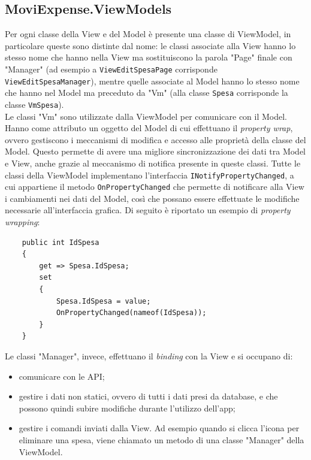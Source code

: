 \subsection{MoviExpense.ViewModels}

Per ogni classe della View e del Model è presente una classe di ViewModel, in particolare queste sono distinte dal nome: le classi associate alla View hanno lo stesso nome che hanno nella View ma sostituiscono la parola "Page" finale con "Manager" (ad esempio a \verb+ViewEditSpesaPage+ corrisponde \verb+ViewEditSpesaManager+), mentre quelle associate al Model hanno lo stesso nome che hanno nel Model ma preceduto da "Vm" (alla classe \verb+Spesa+ corrisponde la classe \verb+VmSpesa+).\\
Le classi "Vm" sono utilizzate dalla ViewModel per comunicare con il Model. Hanno come attributo un oggetto del Model di cui effettuano il \textit{property wrap}, ovvero gestiscono i meccanismi di modifica e accesso alle proprietà della classe del Model. Questo permette di avere una migliore sincronizzazione dei dati tra Model e View, anche grazie al meccanismo di notifica presente in queste classi. Tutte le classi della ViewModel implementano l'interfaccia \verb+INotifyPropertyChanged+, a cui appartiene il metodo \verb+OnPropertyChanged+ che permette di notificare alla View i cambiamenti nei dati del Model, così che possano essere effettuate le modifiche necessarie all'interfaccia grafica. Di seguito è riportato un esempio di \textit{property wrapping}:
\begin{verbatim}
    public int IdSpesa
    {
        get => Spesa.IdSpesa;
        set
        {
            Spesa.IdSpesa = value;
            OnPropertyChanged(nameof(IdSpesa));
        }
    }
\end{verbatim}

\noindent Le classi "Manager", invece, effettuano il \emph{binding} con la View e si occupano di:
\begin{itemize}
    \item comunicare con le API;
    \item gestire i dati non statici, ovvero di tutti i dati presi da database, e che possono quindi subire modifiche durante l'utilizzo dell'app;
    \item gestire i comandi inviati dalla View. Ad esempio quando si clicca l'icona per eliminare una spesa, viene chiamato un metodo di una classe "Manager" della ViewModel.
\end{itemize}

